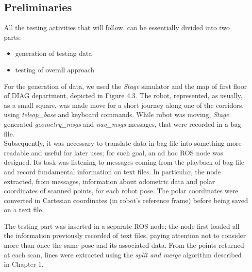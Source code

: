 \documentclass[a4paper, onecolumn]{report}
\begin{document}
\subsection{Preliminaries}
All the testing activities that will follow, can be essentially divided into two parts:
\begin{itemize}
	\item{generation of testing data}
	\item{testing of overall approach}
\end{itemize}
For the generation of data, we used the \emph{Stage} simulator and the map of first floor of DIAG department, depicted in Figure 4.3. The robot, represented, as usually, as a small square, was made move for a short journey along one of the corridors, using \emph{teleop\_base} and keyboard commands. While robot was moving, \emph{Stage} generated \emph{geometry\_msgs} and \emph{nav\_msgs} messages, that were recorded in a bag file. \\
Subsequently, it was necessary to translate data in bag file into something more readable and useful for later uses; for such goal, an ad hoc ROS node was designed. Its task was listening to messages coming from the playback of bag file and record fundamental information on text files. In particular, the node extracted, from messages, information about odometric data and polar coordinates of scanned points, for each robot pose. The polar coordinates were converted in Cartesian coordinates (in robot's reference frame) before being saved on a text file.

The testing part was inserted in a separate ROS node; the node first loaded all the information previously recorded of text files, paying attention not to consider more than once the same pose and its associated data. From the points returned at each scan, lines were extracted using the \emph{split and merge} algorithm described in Chapter 1.
\end{document}
